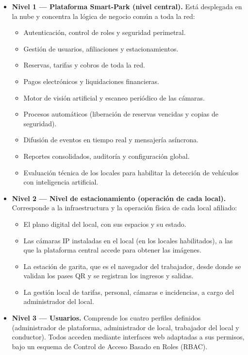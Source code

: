 \begin{itemize}
    \item \textbf{Nivel 1 --- Plataforma Smart-Park (nivel central).} Está desplegada en la nube y concentra la lógica de negocio común a toda la red:
    \begin{itemize}
        \item Autenticación, control de roles y seguridad perimetral.
        \item Gestión de usuarios, afiliaciones y estacionamientos.
        \item Reservas, tarifas y cobros de toda la red.
        \item Pagos electrónicos y liquidaciones financieras.
        \item Motor de visión artificial y escaneo periódico de las cámaras.
        \item Procesos automáticos (liberación de reservas vencidas y copias de seguridad).
        \item Difusión de eventos en tiempo real y mensajería asíncrona.
        \item Reportes consolidados, auditoría y configuración global.
        \item Evaluación técnica de los locales para habilitar la detección de vehículos con inteligencia artificial.
    \end{itemize}
    \item \textbf{Nivel 2 --- Nivel de estacionamiento (operación de cada local).} Corresponde a la infraestructura y la operación física de cada local afiliado:
    \begin{itemize}
        \item El plano digital del local, con sus espacios y su estado.
        \item Las cámaras IP instaladas en el local (en los locales habilitados), a las que la plataforma central accede para obtener las imágenes.
        \item La estación de garita, que es el navegador del trabajador, desde donde se validan los pases QR y se registran los ingresos y salidas.
        \item La gestión local de tarifas, personal, cámaras e incidencias, a cargo del administrador del local.
    \end{itemize}
    \item \textbf{Nivel 3 --- Usuarios.} Comprende los cuatro perfiles definidos (administrador de plataforma, administrador de local, trabajador del local y conductor). Todos acceden mediante interfaces web adaptadas a sus permisos, bajo un esquema de Control de Acceso Basado en Roles (RBAC).
\end{itemize}

